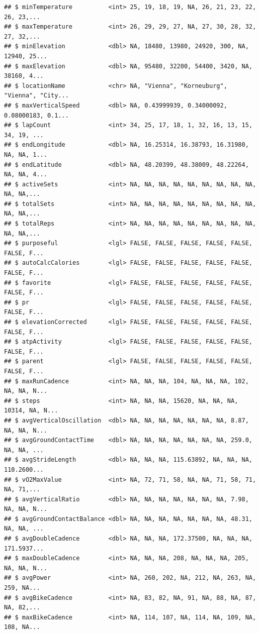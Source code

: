 \documentclass[
]{book}
\begin{document}
\begin{verbatim}
## $ minTemperature          <int> 25, 19, 18, 19, NA, 26, 21, 23, 22, 26, 23,...
## $ maxTemperature          <int> 26, 29, 29, 27, NA, 27, 30, 28, 32, 27, 32,...
## $ minElevation            <dbl> NA, 18480, 13980, 24920, 300, NA, 12940, 25...
## $ maxElevation            <dbl> NA, 95480, 32200, 54400, 3420, NA, 38160, 4...
## $ locationName            <chr> NA, "Vienna", "Korneuburg", "Vienna", "City...
## $ maxVerticalSpeed        <dbl> NA, 0.43999939, 0.34000092, 0.08000183, 0.1...
## $ lapCount                <int> 34, 25, 17, 18, 1, 32, 16, 13, 15, 34, 19, ...
## $ endLongitude            <dbl> NA, 16.25314, 16.38793, 16.31980, NA, NA, 1...
## $ endLatitude             <dbl> NA, 48.20399, 48.38009, 48.22264, NA, NA, 4...
## $ activeSets              <int> NA, NA, NA, NA, NA, NA, NA, NA, NA, NA, NA,...
## $ totalSets               <int> NA, NA, NA, NA, NA, NA, NA, NA, NA, NA, NA,...
## $ totalReps               <int> NA, NA, NA, NA, NA, NA, NA, NA, NA, NA, NA,...
## $ purposeful              <lgl> FALSE, FALSE, FALSE, FALSE, FALSE, FALSE, F...
## $ autoCalcCalories        <lgl> FALSE, FALSE, FALSE, FALSE, FALSE, FALSE, F...
## $ favorite                <lgl> FALSE, FALSE, FALSE, FALSE, FALSE, FALSE, F...
## $ pr                      <lgl> FALSE, FALSE, FALSE, FALSE, FALSE, FALSE, F...
## $ elevationCorrected      <lgl> FALSE, FALSE, FALSE, FALSE, FALSE, FALSE, F...
## $ atpActivity             <lgl> FALSE, FALSE, FALSE, FALSE, FALSE, FALSE, F...
## $ parent                  <lgl> FALSE, FALSE, FALSE, FALSE, FALSE, FALSE, F...
## $ maxRunCadence           <int> NA, NA, NA, 104, NA, NA, NA, 102, NA, NA, N...
## $ steps                   <int> NA, NA, NA, 15620, NA, NA, NA, 10314, NA, N...
## $ avgVerticalOscillation  <dbl> NA, NA, NA, NA, NA, NA, NA, 8.87, NA, NA, N...
## $ avgGroundContactTime    <dbl> NA, NA, NA, NA, NA, NA, NA, 259.0, NA, NA, ...
## $ avgStrideLength         <dbl> NA, NA, NA, 115.63892, NA, NA, NA, 110.2600...
## $ vO2MaxValue             <int> NA, 72, 71, 58, NA, NA, 71, 58, 71, NA, 71,...
## $ avgVerticalRatio        <dbl> NA, NA, NA, NA, NA, NA, NA, 7.98, NA, NA, N...
## $ avgGroundContactBalance <dbl> NA, NA, NA, NA, NA, NA, NA, 48.31, NA, NA, ...
## $ avgDoubleCadence        <dbl> NA, NA, NA, 172.37500, NA, NA, NA, 171.5937...
## $ maxDoubleCadence        <int> NA, NA, NA, 208, NA, NA, NA, 205, NA, NA, N...
## $ avgPower                <int> NA, 260, 202, NA, 212, NA, 263, NA, 259, NA...
## $ avgBikeCadence          <int> NA, 83, 82, NA, 91, NA, 88, NA, 87, NA, 82,...
## $ maxBikeCadence          <int> NA, 114, 107, NA, 114, NA, 109, NA, 108, NA...

\end{verbatim}
\end{document}
